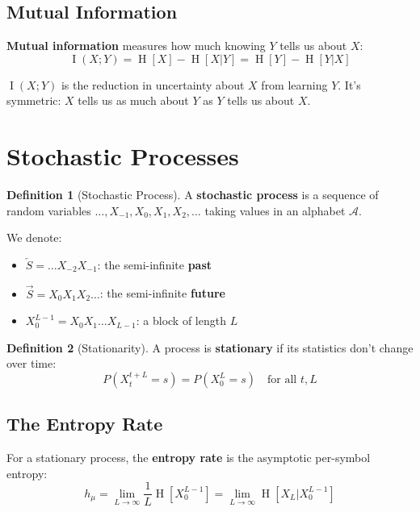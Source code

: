 \documentclass[11pt,a4paper]{article}
\theoremstyle{definition}
\newtheorem{definition}{Definition}[section]
\theoremstyle{plain}
\newcommand{\hmu}{h_\mu}
\newcommand{\calA}{\mathcal{A}}
\newcommand{\Past}{\overleftarrow{S}}
\newcommand{\Future}{\overrightarrow{S}}
\DeclareMathOperator{\Ent}{H}
\DeclareMathOperator{\MI}{I}
\begin{document}
\subsection{Mutual Information}

\textbf{Mutual information} measures how much knowing $Y$ tells us about $X$:
\begin{equation}
    \MI(X; Y) = \Ent[X] - \Ent[X|Y] = \Ent[Y] - \Ent[Y|X]
\end{equation}

\begin{intuition}
$\MI(X; Y)$ is the reduction in uncertainty about $X$ from learning $Y$. It's symmetric: $X$ tells us as much about $Y$ as $Y$ tells us about $X$.
\end{intuition}

\section{Stochastic Processes}
\label{sec:processes}

\begin{definition}[Stochastic Process]
A \textbf{stochastic process} is a sequence of random variables $\ldots, X_{-1}, X_0, X_1, X_2, \ldots$ taking values in an alphabet $\calA$.
\end{definition}

We denote:
\begin{itemize}
    \item $\Past = \ldots X_{-2} X_{-1}$: the semi-infinite \textbf{past}
    \item $\Future = X_0 X_1 X_2 \ldots$: the semi-infinite \textbf{future}
    \item $X_0^{L-1} = X_0 X_1 \ldots X_{L-1}$: a block of length $L$
\end{itemize}

\begin{definition}[Stationarity]
A process is \textbf{stationary} if its statistics don't change over time:
\[
    P(X_t^{t+L} = s) = P(X_0^L = s) \quad \text{for all } t, L
\]
\end{definition}

\subsection{The Entropy Rate}

For a stationary process, the \textbf{entropy rate} is the asymptotic per-symbol entropy:
\begin{equation}
    \hmu = \lim_{L \to \infty} \frac{1}{L} \Ent[X_0^{L-1}] = \lim_{L \to \infty} \Ent[X_L | X_0^{L-1}]
\end{equation}
\end{document}
